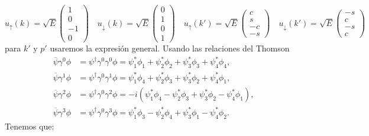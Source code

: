 \begin{equation}
	u_\uparrow(k) = \sqrt{E} \begin{pmatrix}
		1 \\ 0 \\ -1 \\ 0
	\end{pmatrix} \quad
	u_\downarrow(k)= \sqrt{E} \begin{pmatrix}
		0 \\ 1 \\ 0 \\ 1
	\end{pmatrix}  \quad
	u_\uparrow(k') = \sqrt{E} \begin{pmatrix}
		c \\ s \\ -c \\ -s
	\end{pmatrix} \quad
	u_\downarrow(k')= \sqrt{E} \begin{pmatrix}
		-s \\ c \\ -s \\ c
	\end{pmatrix}
\end{equation}
para $k'$ y $p'$ usaremos la expresión general. Usando las relaciones del Thomson \cite{thomson_modern_physics}
\begin{align}
	\overline{\psi}\gamma^0\phi & = \psi^\dagger \gamma^0 \gamma^0 \phi
	= \psi_1^*\phi_1 + \psi_2^*\phi_2 + \psi_3^*\phi_3 + \psi_4^*\phi_4,     \\
	\overline{\psi}\gamma^1\phi & = \psi^\dagger \gamma^0 \gamma^1 \phi
	= \psi_1^*\phi_4 + \psi_2^*\phi_3 + \psi_3^*\phi_2 + \psi_4^*\phi_1,     \\
	\overline{\psi}\gamma^2\phi & = \psi^\dagger \gamma^0 \gamma^2 \phi
	= -i(\psi_1^*\phi_4 - \psi_2^*\phi_3 + \psi_3^*\phi_2 - \psi_4^*\phi_1), \\
	\overline{\psi}\gamma^3\phi & = \psi^\dagger \gamma^0 \gamma^3 \phi
	= \psi_1^*\phi_3 - \psi_2^*\phi_4 + \psi_3^*\phi_1 - \psi_4^*\phi_2.
\end{align}
Tenemos que:


